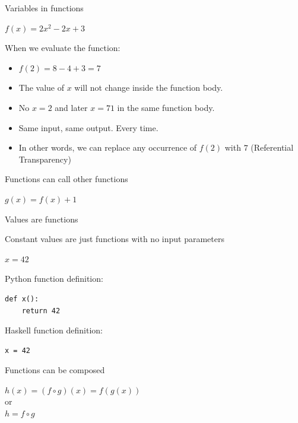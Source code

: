 \documentclass[mathserif]{beamer}
\begin{document}
\begin{frame}{Variables in functions}

  {\Huge $f(x) = 2x^2 - 2x + 3$}

  \vskip5mm

When we evaluate the function:
  \begin{itemize}[<+->]
    \item $f(2) = 8 - 4 + 3 = 7$
    \item The value of $x$ will not change inside the function body.
    \item No $x = 2$ and later $x = 71$ in the same function body.
    \item Same input, same output. Every time.
    \item In other words, we can replace any occurrence of $f(2)$ with
      $7$ (Referential Transparency)
  \end{itemize}
\end{frame}


\begin{frame}{Functions can call other functions}

  {\Huge $g(x) = f(x) + 1$}

\end{frame}

\begin{frame}[fragile]{Values are functions}

  {\large Constant values are just functions with no input parameters}

  \vskip5mm

  {\Huge $x = 42$}

  \vskip5mm

Python function definition:
  \begin{verbatim}
def x():
    return 42
  \end{verbatim}

Haskell function definition:
  \begin{verbatim}
x = 42
  \end{verbatim}

\end{frame}

\begin{frame}{Functions can be composed}

  {\Huge $h(x) = (f \circ g)(x) = f(g(x))$\\
  \vskip5mm
  or\\
  \vskip5mm
  $h = f \circ g$}

\end{frame}
\end{document}
